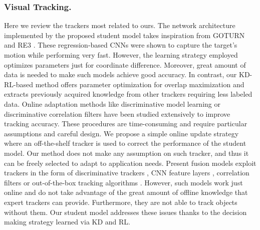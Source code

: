 \documentclass[runningheads]{llncs}
\begin{document}
\subsubsection{Visual Tracking.} Here we review the trackers most related to ours. The network architecture implemented by the proposed student model takes inspiration from GOTURN \cite{GOTURN} and RE3 \cite{RE3}. These regression-based CNNs were shown to capture the target's motion while performing very fast. However, the learning strategy employed optimizes parameters just for coordinate difference. Moreover, great amount of data is needed to make such models achieve good accuracy. In contrast, our KD-RL-based method offers parameter optimization for overlap maximization and extracts previously acquired knowledge from other trackers requiring less labeled data.
Online adaptation methods like discriminative model learning \cite{TLD,MDNet,RealTimeMDNet} or discriminative correlation filters \cite{ECO,ATOM,DiMP} have been studied extensively to improve tracking accuracy. These procedures are time-consuming and require particular assumptions and careful design. We propose a simple online update strategy where an off-the-shelf tracker is used to correct the performance of the student model. Our method does not make any assumption on such tracker, and thus it can be freely selected to adapt to application needs.
Present fusion models exploit trackers in the form of discriminative trackers \cite{MEEM}, CNN feature layers \cite{Qi2016}, correlation filters \cite{Li2019} or out-of-the-box tracking algorithms \cite{Yoon2012,Wang2014,Bailer2014,HMMTxD}. However, such models work just online and do not take advantage of the great amount of offline knowledge that expert trackers can provide. Furthermore, they are not able to track objects without them. Our student model addresses these issues thanks to the decision making strategy learned via KD and RL.
\end{document}

